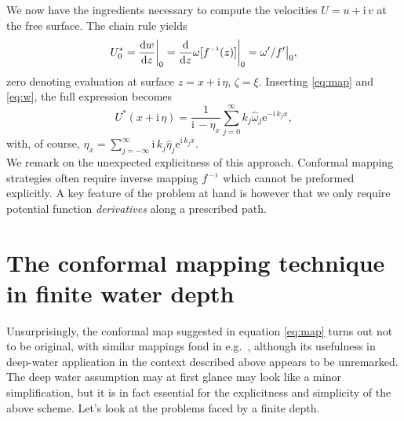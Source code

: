\documentclass[a4paper,12pt]{article}
\newcommand{\mr}{\mathrm}
\newcommand{\ii}{\mr{i}\,}
\newcommand{\ee}{\mr{e}}
\renewcommand{\_}[1]{_\mr{#1}}
\newcommand{\w}{w}
\newcommand{\h}{\hat}
\newcommand{\z}{z}
\newcommand{\x}{x}
\newcommand{\zz}{\zeta}
\newcommand{\xx}{\xi}
\newcommand{\zmap}{f}
\newcommand{\zzmap}{\zmap^{\raisebox{.2ex}{$\scriptscriptstyle-1$}}}
\newcommand{\ww}{\omega}
\renewcommand{\w}{w}
\newcommand{\surf}{\eta}
\newcommand{\dd}[2]{\frac{\mr d #1}{\mr d #2}}
\begin{document}
We now have the ingredients necessary to compute the velocities $U=u+\ii v$ at the free surface. 
The chain rule yields
\begin{equation*}
U_0^* = \dd{\w}{\z}\bigg|_{0} = \dd{}{\z}\ww[\zzmap(\z)]\bigg|_0 = \ww'/\zmap' \big|_0,
\end{equation*}
zero denoting evaluation at surface $\z=\x+\ii\surf$, $\zz=\xx$.
Inserting \eqref{eq:map} and \eqref{eq:w}, the full expression becomes
\begin{equation}
U^*(\x+\ii\surf) = \frac{1}{\ii- \surf_{\x}}\sum_{j=0}^\infty  k_j \h\ww_j \ee^{-\ii k_j \x},
\label{eq:U}
\end{equation}
with, of course, $\surf_\x=\sum_{j=-\infty}^\infty\ii k_j\h\surf_j\ee^{\ii k_j \x}$.
\\

We remark on the unexpected explicitness of this approach. 
Conformal mapping strategies often require inverse mapping $\zzmap$ which cannot be preformed explicitly. 
A key feature of the problem at hand is however that we only require potential function \textit{derivatives} along a prescribed path.






\section{The conformal mapping technique in finite water depth}
\label{sec:finiteDepth}
Unsurprisingly, the conformal map suggested in equation \eqref{eq:map} turns out not to be original, with similar mappings fond in e.g.~\citet{chalikov2005modeling}, although its usefulness in deep-water application in the context described above appears to be unremarked.
The deep water assumption may at first glance may look like a minor simplification, but it is in fact essential for the explicitness and simplicity of the above scheme. 
Let's look at the problems faced by a finite depth.
\\
\end{document}
